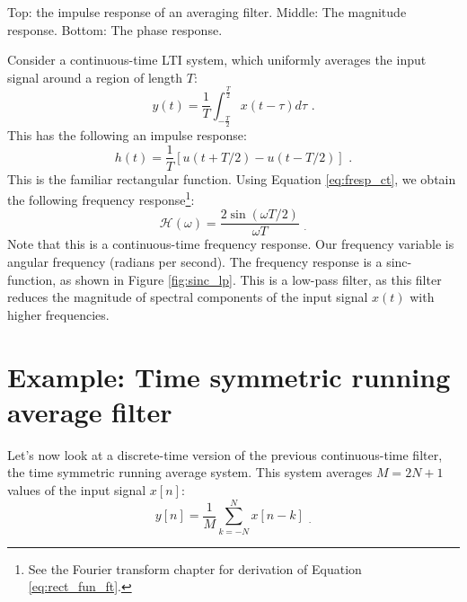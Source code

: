 \begin{marginfigure}
\begin{center}
    \end{center}
    \caption{Top: the impulse response of an averaging filter. Middle:
        The magnitude response. Bottom: The phase response.}
    \label{fig:sinc_lp}
\end{marginfigure}

Consider a continuous-time LTI system, which uniformly averages the
input signal around a region of length $T$:
\begin{equation}
    y(t) = \frac{1}{T}\int_{-\frac{T}{2}}^{\frac{T}{2}} x(t-\tau)d\tau \,\,.
\end{equation}
This has the following an impulse response:
\begin{equation}
    h(t)=\frac{1}{T}[u(t+T/2)-u(t-T/2)] \,\,.
    \label{eq:rect_fun}
\end{equation}
This is the familiar rectangular function. Using
Equation \ref{eq:fresp_ct}, we obtain the following frequency
response\footnote{See the Fourier transform chapter for derivation of
    Equation \ref{eq:rect_fun_ft}.}:
\begin{equation}
    \mathcal{H}(\omega)=\frac{2\sin(\omega T/2)}{\omega T} \,\, _.
    \label{eq:rect_fun_ft}
\end{equation}
Note that this is a continuous-time frequency response. Our frequency
variable is angular frequency (radians per second). The frequency
response is a sinc-function, as shown in
Figure \ref{fig:sinc_lp}. This is a low-pass filter, as this filter
reduces the magnitude of spectral components of the input signal
$x(t)$ with higher frequencies.


\section{Example: Time symmetric running average filter}

Let's now look at a discrete-time version of the previous
continuous-time filter, the time symmetric running average
system. This system averages $M=2N+1$ values of the input signal
$x[n]$:
\begin{equation}
    y[n] = \frac{1}{M} \sum_{k=-N}^{N} x[n-k] \,\, _.
\end{equation}

